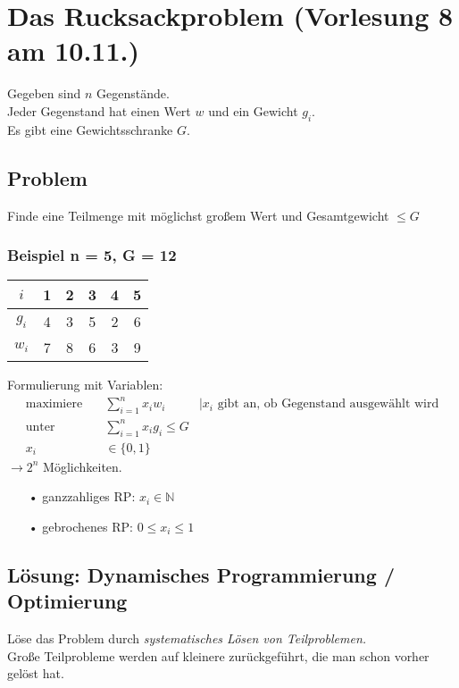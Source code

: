 \section{Das Rucksackproblem \tiny (Vorlesung 8 am 10.11.)}
Gegeben sind $n$ Gegenstände.\\
Jeder Gegenstand hat einen Wert $w$ und ein Gewicht $g_i$.\\
Es gibt eine Gewichtsschranke $G$.\\
\subsection*{Problem}
Finde eine Teilmenge mit möglichst großem Wert und Gesamtgewicht $\leq G$\\
\subsubsection*{Beispiel n = 5, G = 12}
\begin{tabular}{c|c|c|c|c|c}
$i$ & 1 & 2 & 3 & 4 & 5\\
\hline
$g_i$ & 4 & 3 & 5 & 2 & 6\\
$w_i$ & 7 & 8 & 6 & 3 & 9\\
\end{tabular}
Formulierung mit Variablen:
\begin{align*}
\text{maximiere} \quad &\sum_{i=1}^{n} x_i w_i &|x_i \text{ gibt an, ob Gegenstand ausgewählt wird}\\
\text{unter} \quad &\sum_{i=1}^{n} x_i g_i \leq G\\
x_i &\in \{0,1\}
\end{align*}
$\rightarrow 2^n$ Möglichkeiten.
\begin{enumerate}
\item[•] ganzzahliges RP: $x_i \in \mathbb{N}$
\item[•] gebrochenes RP: $0\leq x_i \leq 1$
\end{enumerate}
\subsection{Lösung: Dynamisches Programmierung / Optimierung}
Löse das Problem durch \emph{systematisches Lösen von Teilproblemen.}\\
Große Teilprobleme werden auf kleinere zurückgeführt, die man schon vorher gelöst hat.\\
